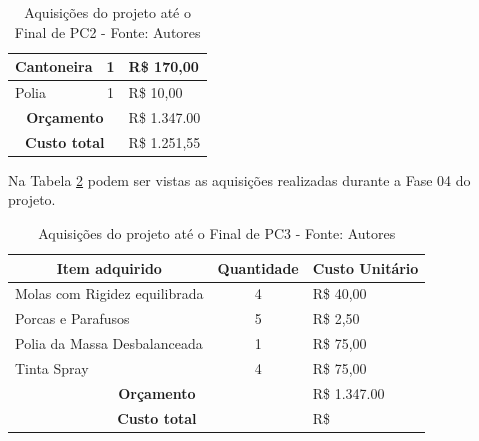 \begin{table}[H]
\begin{tabular}{|l|c|l|}
Cantoneira                                                     & 1                 & R\$ 170,00                             \\ \hline
Polia                                                               & 1                 & R\$ 10,00                              \\ \hline
\multicolumn{2}{|c|}{\textbf{Orçamento}}                      & R\$ 1.347.00                         \\ \hline
\multicolumn{2}{|c|}{\textbf{Custo total}}                      & R\$ 1.251,55                          \\ \hline
\end{tabular}
\caption{Aquisições do projeto até o Final de PC2 - Fonte: Autores}
\label{tab:acompanhamento_custos}
\end{table}

Na Tabela \ref{tab:acompanhamento_custos_1} podem ser vistas as aquisições realizadas durante a Fase 04 do projeto.

\begin{table}[H]
\centering
\begin{tabular}{|l|c|l|}
\hline
\multicolumn{1}{|c|}{\textbf{Item adquirido}} & \textbf{Quantidade} & \multicolumn{1}{c|}{\textbf{Custo Unitário}} \\ \hline
Molas com Rigidez equilibrada                                          & 4                & R\$ 40,00                           \\ \hline
Porcas e Parafusos                                                             & 5                & R\$ 2,50                            \\ \hline
Polia da Massa Desbalanceada                                          & 1               & R\$ 75,00                           \\ \hline
Tinta Spray                                                                          & 4                & R\$ 75,00                         \\ \hline
\multicolumn{2}{|c|}{\textbf{Orçamento}}                      & R\$ 1.347.00                         \\ \hline
\multicolumn{2}{|c|}{\textbf{Custo total}}                      & R\$                           \\ \hline
\end{tabular}
\caption{Aquisições do projeto até o Final de PC3 - Fonte: Autores}
\label{tab:acompanhamento_custos_1}
\end{table}

